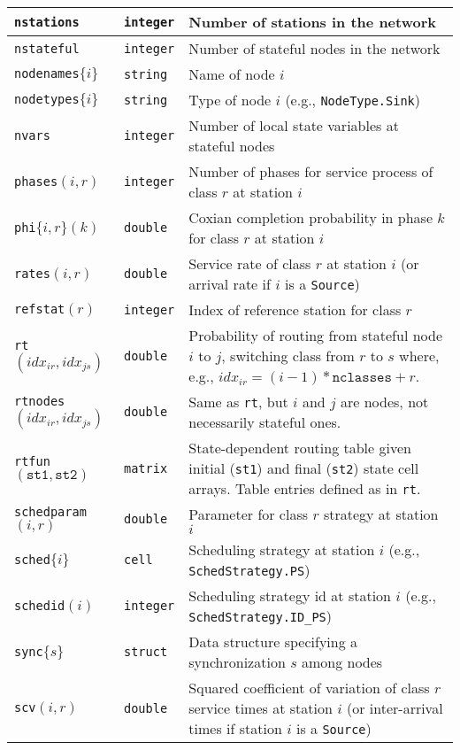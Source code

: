 \begin{table}[thbp]
{\begin{tabular}{|l|l|p{9.5cm}|}
\texttt{nstations} & \texttt{integer} & Number of stations in the network\\\hline
\texttt{nstateful} & \texttt{integer} & Number of stateful nodes in the network\\\hline
\texttt{nodenames}$\{i\}$ & \texttt{string} & Name of node $i$\\\hline
\texttt{nodetypes}$\{i\}$ & \texttt{string} & Type of node $i$ (e.g., \texttt{NodeType.Sink})\\\hline
\texttt{nvars} & \texttt{integer} & Number of local state variables at stateful nodes\\\hline
\texttt{phases}$(i,r)$ & \texttt{integer} & Number of phases for service process of class $r$ at station $i$\\\hline
\texttt{phi}$\{i,r\}(k)$ & \texttt{double} & Coxian completion probability in phase $k$ for class $r$ at station $i$\\\hline
\texttt{rates}$(i,r)$ & \texttt{double} & Service rate of class $r$ at station $i$ (or  arrival rate if $i$ is a \texttt{Source})\\\hline
\texttt{refstat}$(r)$ & \texttt{integer} & Index of reference station for class $r$ \\\hline
\texttt{rt}$(idx_{ir},idx_{js})$  & \texttt{double} & Probability of routing from stateful node $i$ to $j$, switching class from $r$ to $s$ where, e.g., $idx_{ir}=(i-1)*\texttt{nclasses}+r$.\\\hline
\texttt{rtnodes}$(idx_{ir},idx_{js})$  & \texttt{double} & Same as \texttt{rt}, but $i$ and $j$ are nodes, not necessarily stateful ones.\\\hline
\texttt{rtfun}$(\texttt{st1},\texttt{st2})$  & \texttt{matrix} & State-dependent routing table given initial (\texttt{st1}) and final (\texttt{st2}) state cell arrays. Table entries defined as in \texttt{rt}.\\\hline
\texttt{schedparam}$(i,r)$ & \texttt{double} &  Parameter for class $r$ strategy at station $i$\\\hline
\texttt{sched}$\{i\}$& \texttt{cell} & Scheduling strategy at station $i$ (e.g., \texttt{SchedStrategy.PS})\\\hline
\texttt{schedid}$(i)$ & \texttt{integer} & Scheduling strategy id at station $i$ (e.g., \texttt{SchedStrategy.ID\_PS})\\\hline
\texttt{sync}$\{s\}$ & \texttt{struct} & Data structure specifying a synchronization $s$ among nodes\\\hline
\texttt{scv}$(i,r)$ & \texttt{double} & Squared coefficient of variation of class $r$ service times at station $i$ (or inter-arrival times if station $i$ is a \texttt{Source})\\\hline

\end{tabular}}
\end{table}
